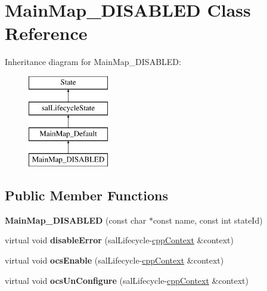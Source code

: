 \hypertarget{class_main_map___d_i_s_a_b_l_e_d}{\section{Main\-Map\-\_\-\-D\-I\-S\-A\-B\-L\-E\-D Class Reference}
\label{class_main_map___d_i_s_a_b_l_e_d}
}
Inheritance diagram for Main\-Map\-\_\-\-D\-I\-S\-A\-B\-L\-E\-D\-:\begin{figure}[H]
\begin{center}
\leavevmode
\includegraphics[height=4.000000cm]{class_main_map___d_i_s_a_b_l_e_d}
\end{center}
\end{figure}
\subsection*{Public Member Functions}
\begin{DoxyCompactItemize}
\item 
\hypertarget{class_main_map___d_i_s_a_b_l_e_d_aed634fa3479d60f76a353baf601560d5}{{\bfseries Main\-Map\-\_\-\-D\-I\-S\-A\-B\-L\-E\-D} (const char $\ast$const name, const int state\-Id)}\label{class_main_map___d_i_s_a_b_l_e_d_aed634fa3479d60f76a353baf601560d5}

\item 
\hypertarget{class_main_map___d_i_s_a_b_l_e_d_a47d98da0abb45f3fdfabf1cfcff7975a}{virtual void {\bfseries disable\-Error} (sal\-Lifecycle-\/\hyperlink{classcpp_context}{cpp\-Context} \&context)}\label{class_main_map___d_i_s_a_b_l_e_d_a47d98da0abb45f3fdfabf1cfcff7975a}

\item 
\hypertarget{class_main_map___d_i_s_a_b_l_e_d_aa49b5cdd59dc9c575a55c8ea9ee5ba3e}{virtual void {\bfseries ocs\-Enable} (sal\-Lifecycle-\/\hyperlink{classcpp_context}{cpp\-Context} \&context)}\label{class_main_map___d_i_s_a_b_l_e_d_aa49b5cdd59dc9c575a55c8ea9ee5ba3e}

\item 
\hypertarget{class_main_map___d_i_s_a_b_l_e_d_a401fa73a5d80d332e460dde2cbd00393}{virtual void {\bfseries ocs\-Un\-Configure} (sal\-Lifecycle-\/\hyperlink{classcpp_context}{cpp\-Context} \&context)}\label{class_main_map___d_i_s_a_b_l_e_d_a401fa73a5d80d332e460dde2cbd00393}

\end{DoxyCompactItemize}

